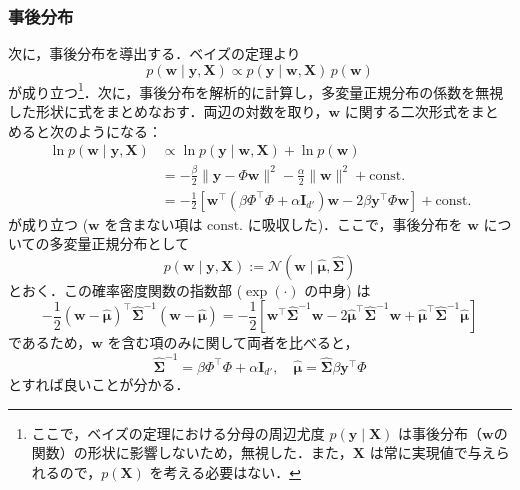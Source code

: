 \documentclass[titlepage]{ltjsbook}
\begin{document}
\subsubsection{事後分布}
次に，事後分布を導出する．ベイズの定理より
\begin{equation}
p(\mathbf{w}\mid \mathbf{y},\mathbf{X}) \propto p(\mathbf{y}\mid \mathbf{w},\mathbf{X})\,p(\mathbf{w})
\end{equation}
が成り立つ\footnote{ここで，ベイズの定理における分母の周辺尤度 $p(\mathbf{y}\mid\mathbf{X})$ は事後分布（$\mathbf{w}$の関数）の形状に影響しないため，無視した．また，$\mathbf{X}$ は常に実現値で与えられるので，$p(\mathbf{X})$ を考える必要はない．}．次に，事後分布を解析的に計算し，多変量正規分布の係数を無視した形状に式をまとめなおす．両辺の対数を取り，$\mathbf{w}$ に関する二次形式をまとめると次のようになる：
\begin{align}
\ln p(\mathbf{w}\mid \mathbf{y},\mathbf{X})
&\propto \ln p(\mathbf{y}\mid \mathbf{w},\mathbf{X}) + \ln p(\mathbf{w}) \\
&= -\frac{\beta}{2}\lVert \mathbf{y}-\Phi\mathbf{w}\rVert^2 -\frac{\alpha}{2}\lVert \mathbf{w}\rVert^2 + \text{const.}\\
&=-\frac{1}{2}\left[\mathbf{w}^\top\left(\beta\Phi^\top\Phi+\alpha\mathbf{I}_{d'}\right)\mathbf{w}-2\beta\mathbf{y}^\top\Phi\mathbf{w}\right]+ \text{const.}
\end{align}
が成り立つ ($\mathbf{w}$ を含まない項は $\mathrm{const.}$ に吸収した)．ここで，事後分布を $\mathbf{w}$ についての多変量正規分布として
\begin{equation}
p(\mathbf{w} \mid \mathbf{y}, \mathbf{X}) := \mathcal{N}(\mathbf{w}\mid \hat{\boldsymbol{\mu}}, \hat{\boldsymbol{\Sigma}})
\end{equation}
とおく．この確率密度関数の指数部 ($\exp(\cdot)$ の中身) は
\begin{equation}
-\frac{1}{2}(\mathbf{w}-\hat{\boldsymbol{\mu}})^\top \hat{\boldsymbol{\Sigma}}^{-1} (\mathbf{w}-\hat{\boldsymbol{\mu}})
= -\frac{1}{2}\left[\mathbf{w}^\top \hat{\boldsymbol{\Sigma}}^{-1} \mathbf{w}
- 2 \hat{\boldsymbol{\mu}}^\top \hat{\boldsymbol{\Sigma}}^{-1} \mathbf{w}
+ \hat{\boldsymbol{\mu}}^\top \hat{\boldsymbol{\Sigma}}^{-1} \hat{\boldsymbol{\mu}}\right]
\end{equation}
であるため，$\mathbf{w}$ を含む項のみに関して両者を比べると，
\begin{equation}
\hat{\boldsymbol{\Sigma}}^{-1}=\beta\Phi^\top\Phi+\alpha\mathbf{I}_{d'},\quad \hat{\boldsymbol{\mu}}=\hat{\boldsymbol{\Sigma}}\beta\mathbf{y}^\top\Phi
\end{equation}
とすれば良いことが分かる．
\end{document}
